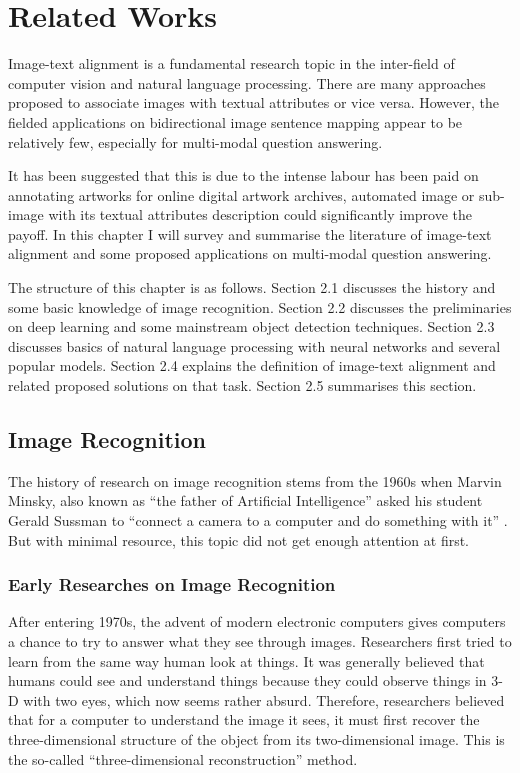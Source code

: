 \chapter{Related Works}
\label{cha:relatedworks}
Image-text alignment is a fundamental research topic in the inter-field of computer vision and natural language processing. There are many approaches proposed to associate images with textual attributes or vice versa. However, the fielded applications on bidirectional image sentence mapping appear to be relatively few, especially for multi-modal question answering. 

It has been suggested that this is due to the intense labour has been paid on annotating artworks for online digital artwork archives, automated image or sub-image with its textual attributes description could significantly improve the payoff. In this chapter I will survey and summarise the literature of image-text alignment and some proposed applications on multi-modal question answering.

The structure of this chapter is as follows. Section 2.1 discusses the history and some basic knowledge of image recognition. Section 2.2 discusses the preliminaries on deep learning and some mainstream object detection techniques. Section 2.3 discusses basics of natural language processing with neural networks and several popular models. Section 2.4 explains the definition of image-text alignment and related proposed solutions on that task. Section 2.5 summarises this section.

\section{Image Recognition}
The history of research on image recognition stems from the 1960s when Marvin Minsky, also known as ``the father of Artificial Intelligence'' asked his student Gerald Sussman to ``connect a camera to a computer and do something with it'' \cite{hill}. But with minimal resource, this topic did not get enough attention at first. 

\subsection{Early Researches on Image Recognition}

After entering 1970s, the advent of modern electronic computers gives computers a chance to try to answer what they see through images. Researchers first tried to learn from the same way human look at things. It was generally believed that humans could see and understand things because they could observe things in 3-D with two eyes, which now seems rather absurd. Therefore, researchers believed that for a computer to understand the image it sees, it must first recover the three-dimensional structure of the object from its two-dimensional image. This is the so-called ``three-dimensional reconstruction'' method.

